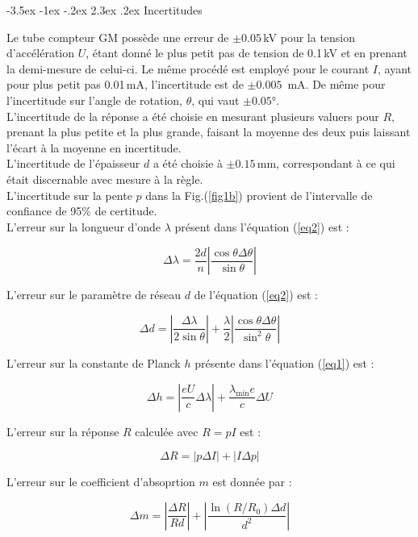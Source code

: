 \documentclass[a4paper, 12pt,oneside]{article}
\makeatletter
\renewcommand{\section}{\@startsection {section}{1}{\z@}%
             {-3.5ex \@plus -1ex \@minus -.2ex}%
             {2.3ex \@plus.2ex}%
             {\normalfont\normalsize\bfseries}}
\makeatother
\begin{document}
\section{Incertitudes}

Le tube compteur GM possède une erreur de $\pm0.05$\,kV pour la tension d'accélération $U$, étant donné le plus petit pas de tension de 0.1\,kV et en prenant la demi-mesure de celui-ci. Le même procédé est employé pour le courant $I$, ayant pour plus petit pas 0.01\,mA, l'incertitude est de $\pm0.005$\, mA. De même pour l'incertitude sur l'angle de rotation, $\theta$, qui vaut $\pm0.05$°.\\

L'incertitude de la réponse a été choisie en mesurant plusieurs valuers pour $R$, prenant la plus petite et la plus grande, faisant la moyenne des deux puis laissant l'écart à la moyenne en incertitude.\\

L'incertitude de l'épaisseur $d$ a été choisie à $\pm0.15$\,mm, correspondant à ce qui était discernable avec mesure à la règle.\\

L'incertitude sur la pente $p$ dans la Fig.(\ref{fig1b}) provient de l'intervalle de confiance  de 95\% de certitude.\\

L'erreur sur la longueur d'onde $\lambda$ présent dans l'équation (\ref{eq2}) est :

\[
    \Delta \lambda = \frac{2d}{n}\left|\frac{\cos{\theta}\Delta\theta}{\sin{\theta}}\right|
\]

L'erreur sur le paramètre de réseau $d$ de l'équation (\ref{eq2}) est :

\[
    \Delta d = \left|\frac{\Delta\lambda}{2\sin{\theta}}\right| +\frac{\lambda}{2}\left|\frac{\cos{\theta}\Delta\theta}{\sin^2{\theta}}\right|
\]

L'erreur sur la constante de Planck $h$ présente dans l'équation (\ref{eq1}) est :

\[
\Delta h = \left| \frac{e U}{c} \Delta \lambda \right| + \frac{\lambda_{\text{min}} e}{c} \Delta U
\]

L'erreur sur la réponse $R$ calculée avec $R=pI$ est :

\[
\Delta R = \lvert p \Delta I \rvert + \lvert I \Delta p \rvert
\]

L'erreur sur le coefficient d'absoprtion $m$ est donnée par :

\[
\Delta m = \left| \frac{\Delta R}{R d} \right| + \left| \frac{\ln \left(R/R_0 \right) \Delta d}{d^2} \right|
\]
\end{document}
